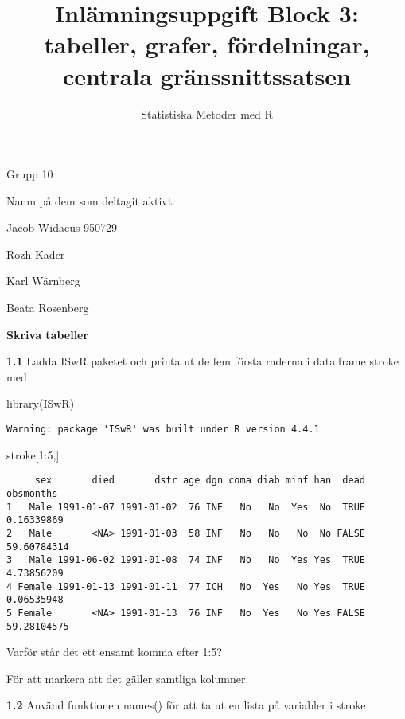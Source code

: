 \documentclass[
  letterpaper,
  DIV=11,
  numbers=noendperiod]{scrartcl}
\title{Inlämningsuppgift Block 3: tabeller, grafer, fördelningar,
centrala gränssnittssatsen}
\author{Statistiska Metoder med R}
\date{}
\newenvironment{Shaded}{\begin{snugshade}}{\end{snugshade}}
\newcommand{\DecValTok}[1]{\textcolor[rgb]{0.68,0.00,0.00}{#1}}
\newcommand{\FunctionTok}[1]{\textcolor[rgb]{0.28,0.35,0.67}{#1}}
\newcommand{\NormalTok}[1]{\textcolor[rgb]{0.00,0.23,0.31}{#1}}
\newcommand{\SpecialCharTok}[1]{\textcolor[rgb]{0.37,0.37,0.37}{#1}}
\begin{document}
\maketitle


Grupp 10

Namn på dem som deltagit aktivt:

Jacob Widaeus 950729

Rozh Kader

Karl Wärnberg

Beata Rosenberg

\hfill\break

\hfill\break

\textbf{Skriva tabeller}

\textbf{1.1} Ladda ISwR paketet och printa ut de fem första raderna i
data.frame stroke med

\begin{Shaded}
\begin{Highlighting}[]
\FunctionTok{library}\NormalTok{(ISwR)}
\end{Highlighting}
\end{Shaded}

\begin{verbatim}
Warning: package 'ISwR' was built under R version 4.4.1
\end{verbatim}

\begin{Shaded}
\begin{Highlighting}[]
\NormalTok{stroke[}\DecValTok{1}\SpecialCharTok{:}\DecValTok{5}\NormalTok{,]}
\end{Highlighting}
\end{Shaded}

\begin{verbatim}
     sex       died       dstr age dgn coma diab minf han  dead   obsmonths
1   Male 1991-01-07 1991-01-02  76 INF   No   No  Yes  No  TRUE  0.16339869
2   Male       <NA> 1991-01-03  58 INF   No   No   No  No FALSE 59.60784314
3   Male 1991-06-02 1991-01-08  74 INF   No   No  Yes Yes  TRUE  4.73856209
4 Female 1991-01-13 1991-01-11  77 ICH   No  Yes   No Yes  TRUE  0.06535948
5 Female       <NA> 1991-01-13  76 INF   No  Yes   No Yes FALSE 59.28104575
\end{verbatim}

Varför står det ett ensamt komma efter 1:5?

För att markera att det gäller samtliga kolumner.

\textbf{1.2} Använd funktionen names() för att ta ut en lista på
variabler i stroke
\end{document}
